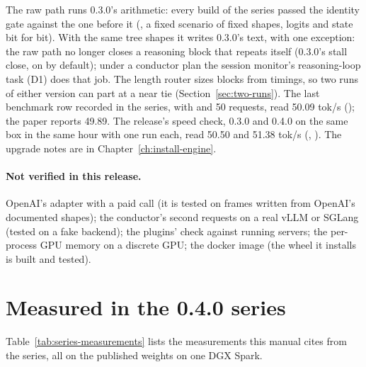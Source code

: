 The raw path runs 0.3.0's arithmetic: every build of the series passed the identity gate against the one before it (, a fixed scenario of fixed shapes, logits and state bit for bit). With the same tree shapes it writes 0.3.0's text, with one exception: the raw path no longer closes a reasoning block that repeats itself (0.3.0's stall close, on by default); under a conductor plan the session monitor's reasoning-loop task (D1) does that job. The length router sizes blocks from timings, so two runs of either version can part at a near tie (Section~\ref{sec:two-runs}). The last benchmark row recorded in the series, with  and 50 requests, read 50.09 tok/s (\measured); the paper reports 49.89. The release's speed check, 0.3.0 and 0.4.0 on the same box in the same hour with one run each, read 50.50 and 51.38 tok/s (\measured, ). The upgrade notes are in Chapter~\ref{ch:install-engine}.

\paragraph{Not verified in this release.} OpenAI's adapter with a paid call (it is tested on frames written from OpenAI's documented shapes); the conductor's second requests on a real vLLM or SGLang (tested on a fake backend); the plugins' check against running servers; the per-process GPU memory on a discrete GPU; the docker image (the wheel it installs is built and tested).

\section{Measured in the 0.4.0 series}

Table~\ref{tab:series-measurements} lists the measurements this manual cites from the series, all on the published weights on one DGX Spark.

